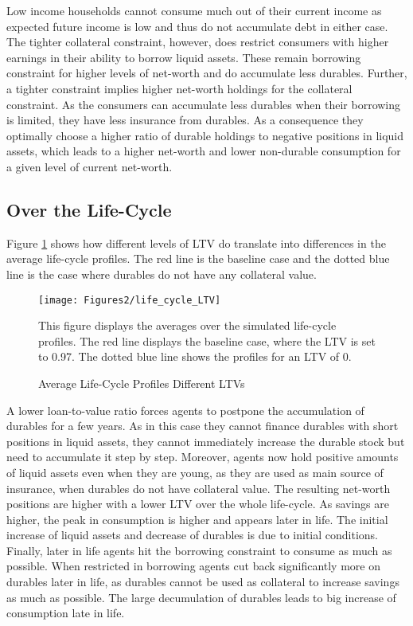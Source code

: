 \documentclass[a4paper,12pt,legno]{article}
\begin{document}
Low income households cannot consume much out of their current income as expected future income is low and thus do not accumulate debt in either case. The tighter collateral constraint, however, does restrict consumers with higher earnings in their ability to borrow liquid assets. These remain borrowing constraint for higher levels of net-worth and do accumulate less durables. Further, a tighter constraint implies higher net-worth holdings for the collateral constraint. As the consumers can accumulate less durables when their borrowing is limited, they have less insurance from durables. As a consequence they optimally choose a higher ratio of durable holdings to negative positions in liquid assets, which leads to a higher net-worth and lower non-durable consumption for a given level of current net-worth.

\subsection{Over the Life-Cycle}
Figure \ref{downpayment_vs_baseline_lc} shows how different levels of LTV do translate into differences in the average life-cycle profiles. The red line is the baseline case and the dotted blue line is the case where durables do not have any collateral value. \begin{figure}[!htbp]
\caption{Average Life-Cycle Profiles Different LTVs} 
\label{downpayment_vs_baseline_lc}	%
\centering
\texttt{[image: Figures2/life\_cycle\_LTV]}  %

\begin{minipage}{0.8\linewidth}
\footnotesize{This figure displays the averages over the simulated life-cycle profiles. The red line displays the baseline case, where the LTV is set to 0.97. The dotted blue line shows the profiles for an LTV of 0.}
\end{minipage}

\end{figure}A lower loan-to-value ratio forces agents to  postpone the accumulation of durables for a few years. As in this case they cannot finance durables with short positions in liquid assets, they cannot immediately increase the durable stock but need to accumulate it step by step. Moreover, agents now hold positive amounts of liquid assets even when they are young, as they are used as main source of insurance, when durables do not have collateral value. The resulting net-worth positions are higher with a lower LTV over the whole life-cycle. As savings are higher, the peak in consumption is higher and appears later in life.
The initial increase of liquid assets and decrease of durables is due to initial conditions. Finally, later in life agents hit the borrowing constraint to consume as much as possible. When restricted in borrowing agents cut back significantly more on durables later in life, as durables cannot be used as collateral to increase savings as much as possible. The large decumulation of durables leads to big increase of consumption late in life. 
\end{document}
